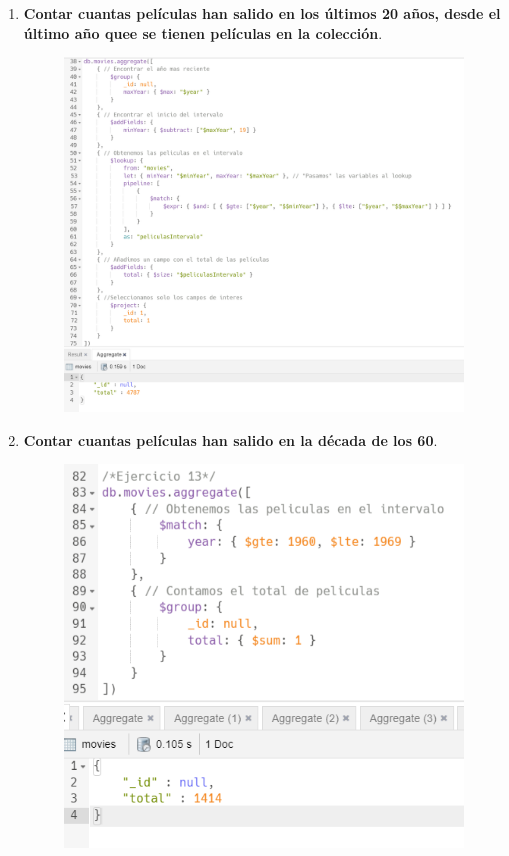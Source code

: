 \documentclass[a4paper,onecolumn]{article}
\begin{document}
\begin{sloppypar}
\begin{enumerate}
\begin{center}
\begin{figure}[h!]
        \end{figure}
    \end{center}
    \item \textbf{Contar cuantas películas han salido en los últimos 20 años, desde el último año quee se tienen películas en la colección}.
    \begin{center}
        \begin{figure}[h!]
            \includegraphics[width=\textwidth]{querys/12.png}
        \end{figure}
    \end{center}
    \item \textbf{Contar cuantas películas han salido en la década de los 60}.
    \begin{center}
        \begin{figure}[h!]
            \includegraphics[width=\textwidth]{querys/13.png}

\end{figure}
\end{center}
\end{enumerate}
\end{sloppypar}
\end{document}
